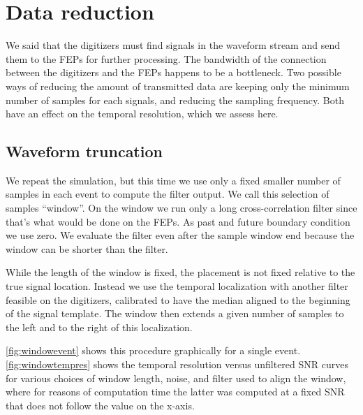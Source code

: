 \section{Data reduction}

We said that the digitizers must find signals in the waveform stream and send
them to the FEPs for further processing. The bandwidth of the connection
between the digitizers and the FEPs happens to be a bottleneck. Two possible
ways of reducing the amount of transmitted data are keeping only the minimum
number of samples for each signals, and reducing the sampling frequency. Both
have an effect on the temporal resolution, which we assess here.

\subsection{Waveform truncation}

We repeat the simulation, but this time we use only a fixed smaller number of
samples in each event to compute the filter output. We call this selection of
samples ``window''. On the window we run only a long cross-correlation filter
since that's what would be done on the FEPs. As past and future boundary
condition we use zero. We evaluate the filter even after the sample window end
because the window can be shorter than the filter.

While the length of the window is fixed, the placement is not fixed relative to
the true signal location. Instead we use the temporal localization with another
filter feasible on the digitizers, calibrated to have the median aligned to the
beginning of the signal template. The window then extends a given number of
samples to the left and to the right of this localization.

\autoref{fig:windowevent} shows this procedure graphically for a single
event. \autoref{fig:windowtempres} shows the temporal resolution versus
unfiltered SNR curves for various choices of window length, noise, and filter
used to align the window, where for reasons of computation time the latter was
computed at a fixed SNR that does not follow the value on the x-axis.

\begin{figure}
    

\end{figure}

